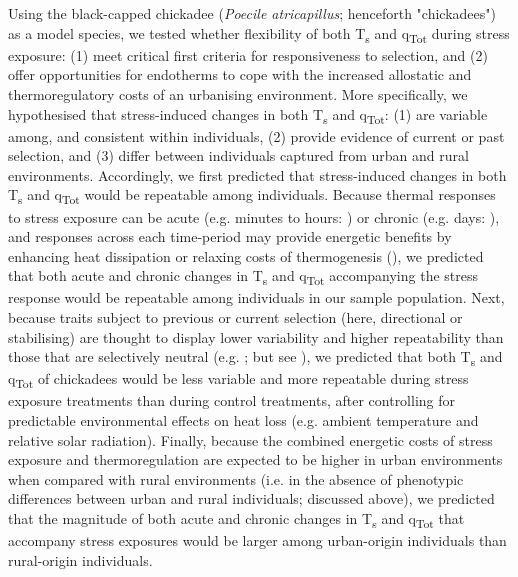 \documentclass[12pt]{article}
\begin{document}
\noindent Using the black-capped chickadee (\textit{Poecile atricapillus}; henceforth "chickadees") as a model species, we tested whether flexibility of both T\textsubscript{s} and q\textsubscript{Tot} during stress exposure: (1) meet critical first criteria for responsiveness to selection, and (2) offer opportunities for endotherms to cope with the increased allostatic and thermoregulatory costs of an urbanising environment. More specifically, we hypothesised that stress-induced changes in both T\textsubscript{s} and q\textsubscript{Tot}: (1) are variable among, and consistent within individuals, (2) provide evidence of current or past selection, and (3) differ between individuals captured from urban and rural environments. Accordingly, we first predicted that stress-induced changes in both T\textsubscript{s} and q\textsubscript{Tot} would be repeatable among individuals. Because thermal responses to stress exposure can be acute (e.g. minutes to hours: \citealt{jerem_2015,andreasson_2020b,winder_2020}) or chronic (e.g. days: \citealt{bittencourt_2015,herborn_2018}), and responses across each time-period may provide energetic benefits by enhancing heat dissipation or relaxing costs of thermogenesis (\citealt{jerem_2018,herborn_2018,winder_2020}), we predicted that both acute and chronic changes in T\textsubscript{s} and q\textsubscript{Tot} accompanying the stress response would be repeatable among individuals in our sample population. Next, because traits subject to previous or current selection (here, directional or stabilising) are thought to display lower variability and higher repeatability than those that are selectively neutral (e.g. \citealt{gibson_1974,lande_1983,boake_1989,vanhomrigh_2007}; but see \citealt{kotiaho_2001}), we predicted that both T\textsubscript{s} and q\textsubscript{Tot} of chickadees would be less variable and more repeatable during stress exposure treatments than during control treatments, after controlling for predictable environmental effects on heat loss (e.g. ambient temperature and relative solar radiation). Finally, because the combined energetic costs of stress exposure and thermoregulation are expected to be higher in urban environments when compared with rural environments (i.e. in the absence of phenotypic differences between urban and rural individuals; discussed above), we predicted that the magnitude of both acute and chronic changes in T\textsubscript{s} and q\textsubscript{Tot} that accompany stress exposures would be larger among urban-origin individuals than rural-origin individuals. \vspace{1cm}
\end{document}
